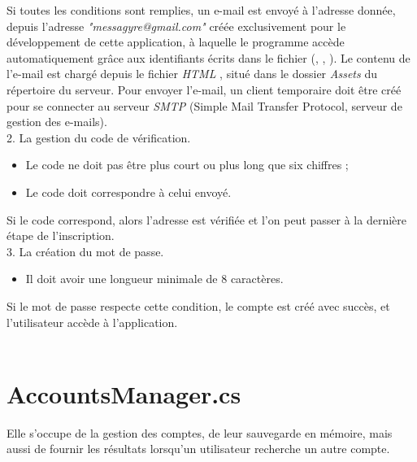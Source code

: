 \documentclass[12pt]{report}
\begin{document}
Si toutes les conditions sont remplies, un e-mail est envoyé à l’adresse donnée, depuis l’adresse \textit{"messagyre@gmail.com"} créée exclusivement pour le développement de cette application, à laquelle le programme accède automatiquement grâce aux identifiants écrits dans le fichier (, , ). Le contenu de l’e-mail est chargé depuis le fichier \textit{HTML} , situé dans le dossier \textit{Assets} du répertoire du serveur. Pour envoyer l’e-mail, un client temporaire doit être créé pour se connecter au serveur \textit{SMTP} (Simple Mail Transfer Protocol, serveur de gestion des e-mails).
\\

2. La gestion du code de vérification.

\begin{itemize}
    \item Le code ne doit pas être plus court ou plus long que six chiffres ;
    \item Le code doit correspondre à celui envoyé.
\end{itemize}

Si le code correspond, alors l’adresse est vérifiée et l’on peut passer à la dernière étape de l’inscription.
\\

3. La création du mot de passe.

\begin{itemize}
    \item Il doit avoir une longueur minimale de 8 caractères.
\end{itemize}

Si le mot de passe respecte cette condition, le compte est créé avec succès, et l’utilisateur accède à l’application.
\\\\

\section{AccountsManager.cs}
Elle s’occupe de la gestion des comptes, de leur sauvegarde en mémoire, mais aussi de fournir les résultats lorsqu’un utilisateur recherche un autre compte.
\end{document}
